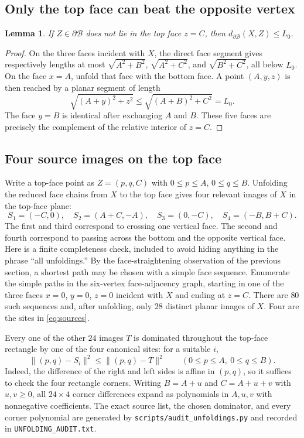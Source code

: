\documentclass[11pt]{article}
\newtheorem{lemma}[theorem]{Lemma}
\theoremstyle{definition}
\newcommand{\Surf}{\partial\mathcal B}
\newcommand{\distS}{d_{\Surf}}
\begin{document}
\subsection{Only the top face can beat the opposite vertex}

\begin{lemma}\label{lem:not-top}
If $Z\in\Surf$ does not lie in the top face $z=C$, then
$\distS(X,Z)\le L_0$.
\end{lemma}

\begin{proof}
On the three faces incident with $X$, the direct face segment gives respectively
lengths at most $\sqrt{A^2+B^2}$, $\sqrt{A^2+C^2}$, and
$\sqrt{B^2+C^2}$, all below $L_0$.  On the face $x=A$, unfold that face with
the bottom face.  A point $(A,y,z)$ is then reached by a planar segment of
length
\[
  \sqrt{(A+y)^2+z^2}\le\sqrt{(A+B)^2+C^2}=L_0.
\]
The face $y=B$ is identical after exchanging $A$ and $B$.  These five faces
are precisely the complement of the relative interior of $z=C$.
\end{proof}

\subsection{Four source images on the top face}

Write a top-face point as $Z=(p,q,C)$ with
$0\le p\le A$, $0\le q\le B$.  Unfolding the reduced face chains from $X$ to
the top face gives four relevant images of $X$ in the top-face plane:
\begin{equation}\label{eq:sources}
  S_1=(-C,0),\quad S_2=(A+C,-A),\quad
  S_3=(0,-C),\quad S_4=(-B,B+C).
\end{equation}
The first and third correspond to crossing one vertical face.  The second and
fourth correspond to passing across the bottom and the opposite vertical
face.  Here is a finite completeness check, included to avoid hiding anything
in the phrase ``all unfoldings.''  By the face-straightening observation of the
previous section, a shortest path may be chosen with a simple face sequence.
Enumerate the simple paths in the six-vertex face-adjacency graph, starting in
one of the three faces $x=0$, $y=0$, $z=0$ incident with $X$ and ending at
$z=C$.  There are $80$ such sequences and, after unfolding, only $28$
distinct planar images of $X$.  Four are the sites in \eqref{eq:sources}.

Every one of the other $24$ images $T$ is dominated throughout the top-face
rectangle by one of the four canonical sites: for a suitable $i$,
\[
  \lVert(p,q)-S_i\rVert^2\le \lVert(p,q)-T\rVert^2
  \qquad(0\le p\le A,\ 0\le q\le B).
\]
Indeed, the difference of the right and left sides is affine in $(p,q)$, so it
suffices to check the four rectangle corners.  Writing
$B=A+u$ and $C=A+u+v$ with $u,v\ge0$, all $24\times4$ corner differences
expand as polynomials in $A,u,v$ with nonnegative coefficients.  The exact
source list, the chosen dominator, and every corner polynomial are generated
by \texttt{scripts/audit\_unfoldings.py} and recorded in
\texttt{UNFOLDING\_AUDIT.txt}.
\end{document}
